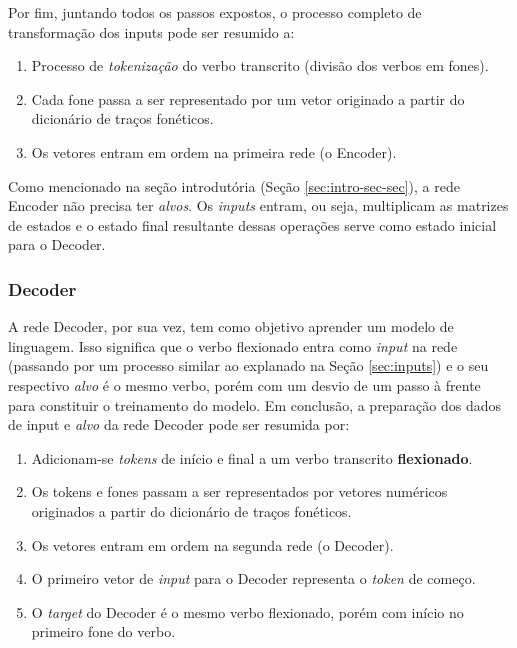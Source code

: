 Por fim, juntando todos os passos expostos, o processo completo de transformação dos inputs pode ser resumido a:

\begin{enumerate}
    \item Processo de \textit{tokenização} do verbo transcrito (divisão dos verbos em fones).
    \item Cada fone passa a ser representado por um vetor originado a partir do dicionário de traços fonéticos.
    \item Os vetores entram em ordem na primeira rede (o Encoder).
\end{enumerate}

Como mencionado na seção introdutória (Seção \ref{sec:intro-sec-sec}), a rede Encoder não precisa ter \textit{alvos}. Os \textit{inputs} entram, ou seja, multiplicam as matrizes de estados e o estado final resultante dessas operações serve como estado inicial para o Decoder. 

\subsubsection{Decoder}

A rede Decoder, por sua vez, tem como objetivo aprender um modelo de linguagem. Isso significa que o verbo flexionado entra como \textit{input} na rede (passando por um processo similar ao explanado na Seção \ref{sec:inputs}) e o seu respectivo \textit{alvo} é o mesmo verbo, porém com um desvio de um passo à frente para constituir o treinamento do modelo. Em conclusão, a preparação dos dados de input e \textit{alvo} da rede Decoder pode ser resumida por:  

\begin{enumerate}
    \item Adicionam-se \textit{tokens} de início e final a um verbo transcrito \textbf{flexionado}.
    \item Os tokens e fones passam a ser representados por vetores numéricos originados a partir do dicionário de traços fonéticos.
    \item Os vetores entram em ordem na segunda rede (o Decoder).
    \item O primeiro vetor de \textit{input} para o Decoder representa o \textit{token} de começo.
    \item O \textit{target} do Decoder é o mesmo verbo flexionado, porém com início no primeiro fone do verbo.
\end{enumerate}

